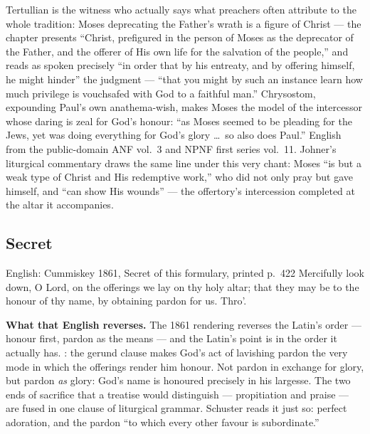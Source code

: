 \begin{witnessnote}
Tertullian is the witness who actually says what preachers often attribute
to the whole tradition: Moses deprecating the Father's wrath is a figure of
Christ --- the chapter presents ``Christ, prefigured in the person of Moses
as the deprecator of the Father, and the offerer of His own life for the
salvation of the people,'' and reads  as spoken precisely
``in order that by his entreaty, and by offering himself, he might hinder''
the judgment --- ``that you might by such an instance learn how much
privilege is vouchsafed with God to a faithful man.'' Chrysostom, expounding
Paul's own anathema-wish, makes Moses the model of the intercessor whose
daring is zeal for God's honour: ``as Moses seemed to be pleading for the
Jews, yet was doing everything for God's glory \dots\ so also does Paul.''
English from the public-domain ANF vol.~3 and NPNF first series vol.~11.
Johner's liturgical commentary draws the same line under this very chant:
Moses ``is but a weak type of Christ and His redemptive work,'' who did not
only pray but gave himself, and ``can show His wounds'' --- the offertory's
intercession completed at the altar it accompanies.
\end{witnessnote}

\elementguard
\subsection*{Secret }


\begin{namedtranslation}{English: Cummiskey 1861, Secret of this formulary, printed p.~422}
Mercifully look down, O Lord, on the offerings we lay on thy holy altar; that
they may be to the honour of thy name, by obtaining pardon for us. Thro'.
\end{namedtranslation}

\textbf{What that English reverses.} The 1861 rendering reverses the
Latin's order --- honour first, pardon as the means --- and the Latin's point
is in the order it actually has. : the gerund clause makes God's act of lavishing
pardon the very mode in which the offerings render him honour. Not pardon
in exchange for glory, but pardon \textit{as} glory: God's name is honoured
precisely in his largesse. The two ends of sacrifice that a treatise would
distinguish --- propitiation and praise --- are fused in one clause of
liturgical grammar. Schuster reads it just so: perfect adoration, and the
pardon ``to which every other favour is subordinate.''

